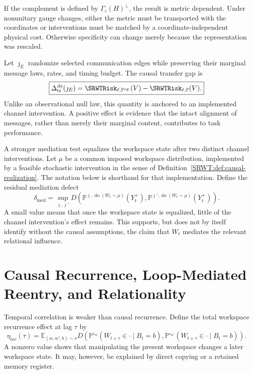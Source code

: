 If the complement is defined by \(\Gamma_\varepsilon(H)^\perp\), the result is
metric dependent. Under nonunitary gauge changes, either the metric must be
transported with the coordinates or interventions must be matched by a
coordinate-independent physical cost. Otherwise specificity can change merely
because the representation was rescaled.


Let \(\jmath_E\) randomize selected communication edges while preserving their
marginal message laws, rates, and timing budget. The causal transfer gap is
\[
\boxed{
\Delta_{\mathrm{tr}}^{\operatorname{do}}(\jmath_E)
=
\SRWTRisk_{\ell,\mathbb P^{\jmath_E}}(V)
-
\SRWTRisk_{\ell,\mathbb P}(V).
}
\]
Unlike an observational null law, this quantity is anchored to an implemented
channel intervention. A positive effect is evidence that the intact alignment
of messages, rather than merely their marginal content, contributes to task
performance.

A stronger mediation test equalizes the workspace state after two distinct
channel interventions. Let \(\mu\) be a common imposed workspace distribution,
implemented by a feasible stochastic intervention in the sense of
Definition~\ref{SRWT:def:causal-realization}. The notation below is shorthand for
that implementation. Define the residual mediation defect
\[
\delta_{\mathrm{med}}
=
\sup_{\jmath,\jmath'}
D\!\left(
\mathbb P^{\jmath,\operatorname{do}(W_t\sim\mu)}(Y_t^+),
\mathbb P^{\jmath',\operatorname{do}(W_t\sim\mu)}(Y_t^+)
\right).
\]
A small value means that once the workspace state is equalized, little of the
channel intervention's effect remains. This supports, but does not by itself
identify without the causal assumptions, the claim that \(W_t\) mediates the
relevant relational influence.

\section{Causal Recurrence, Loop-Mediated Reentry, and Relationality}

Temporal correlation is weaker than causal recurrence. Define the total
workspace recurrence effect at lag \(\tau\) by
\[
\boxed{
\eta_{\mathrm{rec}}(\tau)
=
\mathbb E_{(w,w',b)\sim\nu}
D\!\left(
\mathbb P^{\iota_w}(W_{t+\tau}\in\cdot\mid B_t=b),
\mathbb P^{\iota_{w'}}(W_{t+\tau}\in\cdot\mid B_t=b)
\right).
}
\]
A nonzero value shows that manipulating the present workspace changes a later
workspace state. It may, however, be explained by direct copying or a retained
memory register.

